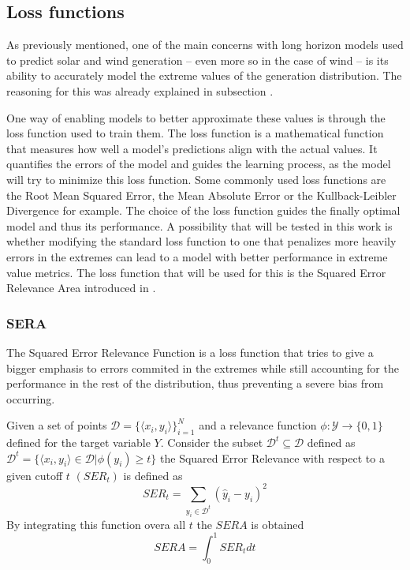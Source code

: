 \subsection{Loss functions}
\label{s:loss-functions}
As previously mentioned, one of the main concerns with long horizon models used to predict solar and wind generation -- even more so in the case of wind -- is its ability to accurately model the extreme values of the generation distribution. The reasoning for this was already explained in  subsection . 

One way of enabling models to better approximate these values is through the loss function used to train them. The loss function is a mathematical function that measures how well a model's predictions align with the actual values. It quantifies the errors of the model and guides the learning process, as the model will try to minimize this loss function. Some commonly used loss functions are the Root Mean Squared Error, the Mean Absolute Error or the Kullback-Leibler Divergence for example. The choice of the loss function guides the finally optimal model and thus its performance. A possibility that will be tested in this work is whether modifying the standard loss function to one that penalizes more heavily errors in the extremes can lead to a model with better performance in extreme value metrics. The loss function that will be used for this is the Squared Error Relevance Area introduced in \cite{silva_ribeiro_moniz_2022}.
\subsubsection{SERA}
The Squared Error Relevance Function is a loss function that tries to give a bigger emphasis to errors commited in the extremes while still accounting for the performance in the rest of the distribution, thus preventing a severe bias from occurring. 

Given a set of points $\mathcal{D}=\{\langle x_i,y_i\rangle\}^N_{i=1}$ and a relevance function $\phi :\mathcal{Y} \rightarrow \{0,1\}$ defined for the target variable $Y$. Consider the subset $\mathcal{D}^t\subseteq \mathcal{D}$ defined as $\mathcal{D}^t=\{\langle x_i, y_i\rangle \in \mathcal{D} | \phi(y_i)\geq t\}$ the Squared Error Relevance with respect to a given cutoff $t$ $(SER_t)$ is defined as 
\begin{equation}
    SER_t=\sum_{y_i \in \mathcal{D}^t}(\hat{y}_i-y_i)^2
\end{equation}
By integrating this function overa all $t$ the $SERA$ is obtained
\begin{equation}
    SERA=\int_0^1 SER_t dt
\end{equation}

